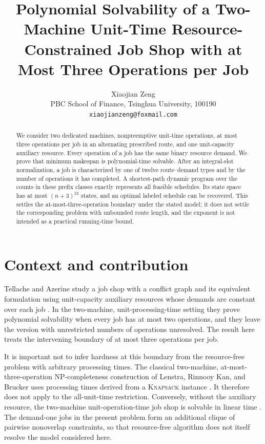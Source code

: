 \documentclass[11pt]{article}
\title{Polynomial Solvability of a Two-Machine Unit-Time Resource-Constrained Job Shop with at Most Three Operations per Job}
\author{Xiaojian Zeng\\
PBC School of Finance, Tsinghua University, 100190\\
\texttt{xiaojianzeng@foxmail.com}}
\date{}
\begin{document}
\maketitle

\begin{abstract}
We consider two dedicated machines, nonpreemptive unit-time operations, at
most three operations per job in an alternating prescribed route, and one
unit-capacity auxiliary resource.  Every operation of a job has the same
binary resource demand.  We prove that minimum makespan is polynomial-time
solvable.  After an integral-slot normalization, a job is characterized by
one of twelve route--demand types and by the number of operations it has
completed.  A shortest-path dynamic program over the counts in these prefix
classes exactly represents all feasible schedules.  Its state space has at
most $(n+3)^{24}$ states, and an optimal labeled schedule can be recovered.
This settles the at-most-three-operation boundary under the stated model; it
does not settle the corresponding problem with unbounded route length, and
the exponent is not intended as a practical running-time bound.
\end{abstract}

\section{Context and contribution}

Tellache and Azerine study a job shop with a conflict graph and its
equivalent formulation using unit-capacity auxiliary resources whose demands
are constant over each job \cite{TellacheAzerine2026}.  In the two-machine,
unit-processing-time setting they prove polynomial solvability when every job
has at most two operations, and they leave the version with unrestricted
numbers of operations unresolved.  The result here treats the intervening
boundary of at most three operations per job.

It is important not to infer hardness at this boundary from the
resource-free problem with arbitrary processing times.  The classical
two-machine, at-most-three-operation NP-completeness construction of Lenstra,
Rinnooy Kan, and Brucker uses processing times derived from a \textsc{Knapsack}
instance \cite{LenstraRinnooyKanBrucker1977}.  It therefore does not apply to
the all-unit-time restriction.  Conversely, without the auxiliary resource,
the two-machine unit-operation-time job shop is solvable in linear time
\cite{HefetzAdiri1982}.  The demand-one jobs in the present problem form an
additional clique of pairwise nonoverlap constraints, so that resource-free
algorithm does not itself resolve the model considered here.
\end{document}
